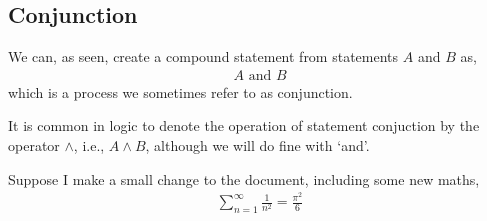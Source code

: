 \subsection{Conjunction}
We can, as seen, create a compound statement from statements $ A $ and $ B $ as,
\begin{align*}
	A \text{ and } B
\end{align*}
which is a process we sometimes refer to as conjunction.

\begin{notation}
	It is common in logic to denote the operation of statement conjuction by the operator $ \land $, i.e., $ A \land B $, although we will do fine with `and'.
\end{notation}

Suppose I make a small change to the document, including some new maths,
\begin{align*}
	\sum_{n=1}^{\infty}{\frac{1}{n^{2}}} = \frac{\pi^{2}}{6}
\end{align*}

